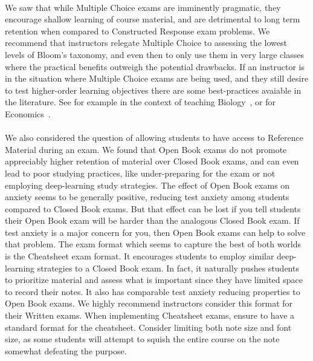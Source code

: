 \documentclass[12pt]{article}
\begin{document}
\paragraph{}
We saw that while Multiple Choice exams are imminently pragmatic, they encourage shallow learning of course material, and are detrimental to long term retention when compared to Constructed Response exam problems. We recommend that instructors relegate Multiple Choice to assessing the lowest levels of Bloom's taxonomy, and even then to only use them in very large classes where the practical benefits outweigh the potential drawbacks. If an instructor is in the situation where Multiple Choice exams are being used, and they still desire to test higher-order learning objectives there are some best-practices avaiable in the literature. See for example in the context of teaching Biology~\cite{crowe2008biology}, or for Economics~\cite{buckles2006using}.
\paragraph{}
We also considered the question of allowing students to have access to Reference Material during an exam. We found that Open Book exams do not promote appreciably higher retention of material over Closed Book exams, and can even lead to poor studying practices, like under-preparing for the exam or not employing deep-learning study strategies. The effect of Open Book exams on anxiety seems to be generally positive, reducing test anxiety among students compared to Closed Book exams. But that effect can be lost if you tell students their Open Book exam will be harder than the analogous Closed Book exam. If test anxiety is a major concern for you, then Open Book exams can help to solve that problem. The exam format which seems to capture the best of both worlds is the Cheatsheet exam format. It encourages students to employ similar deep-learning strategies to a Closed Book exam. In fact, it naturally pushes students to prioritize material and assess what is important since they have limited space to record their notes. It also has comparable test anxiety reducing properties to Open Book exams. We highly recommend instructors consider this format for their Written exams. When implementing Cheatsheet exams, ensure to have a standard format for the cheatsheet. Consider limiting both note size and font size, as some students will attempt to squish the entire course on the note somewhat defeating the purpose.
\end{document}
